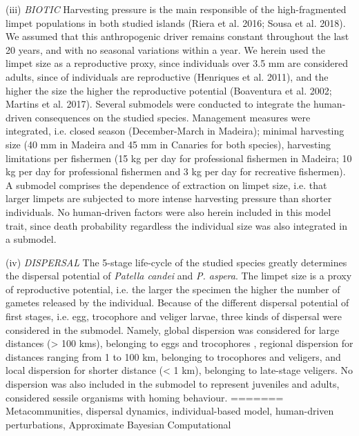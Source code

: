 \documentclass[12pt]{article}
\begin{document}
\begin{flushleft}
{{{{{(iii) \textit{BIOTIC} Harvesting pressure is the main responsible of
the high-fragmented limpet populations in both studied islands (Riera
et al. 2016; Sousa et al. 2018). We assumed that this anthropogenic
driver remains constant throughout the last 20 years, and with no
seasonal variations within a year. We herein used the limpet size as a
reproductive proxy, since individuals over 3.5 mm are considered
adults, since  of individuals are reproductive (Henriques et
al. 2011), and the higher the size the higher the reproductive
potential (Boaventura et al. 2002; Martins et al. 2017). Several
submodels were conducted to integrate the human-driven consequences on
the studied species. Management measures were integrated, i.e. closed
season (December-March in Madeira); minimal harvesting size (40 mm in
Madeira and 45 mm in Canaries for both species), harvesting
limitations per fishermen (15 kg per day for professional fishermen in
Madeira; 10 kg per day for professional fishermen and 3 kg per day for
recreative fishermen). A submodel comprises the dependence of
extraction on limpet size, i.e. that larger limpets are subjected to
more intense harvesting pressure than shorter individuals.  No
human-driven factors were also herein included in this model trait,
since death probability regardless the individual size was also
integrated in a submodel.

(iv) \textit{DISPERSAL} The 5-stage life-cycle of the studied species
greatly determines the dispersal potential of \textit{Patella candei}
and \textit{P. aspera}. The limpet size is a proxy of reproductive
potential, i.e. the larger the specimen the higher the number of
gametes released by the individual. Because of the different dispersal
potential of first stages, i.e. egg, trocophore and veliger larvae,
three kinds of dispersal were considered in the submodel. Namely,
global dispersion was considered for large distances (> 100 kms),
belonging to eggs and trocophores , regional dispersion for distances
ranging from 1 to 100 km, belonging to trocophores and veligers, and
local dispersion for shorter distance (< 1 km), belonging to
late-stage veligers. No dispersion was also included in the submodel
to represent juveniles and adults, considered sessile organisms with
homing behaviour.
=======
Metacommunities, dispersal dynamics, individual-based model, human-driven perturbations, Approximate Bayesian Computational

}}}}}
\end{flushleft}
\end{document}
